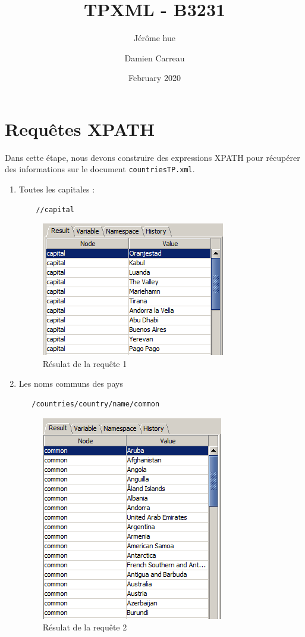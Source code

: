 \documentclass{article}
\title{TPXML - B3231}
\author{Jérôme hue \and Damien Carreau}
\date{February 2020}
\begin{document}
\maketitle

\section{Requêtes XPATH}
Dans cette étape, nous devons construire des expressions XPATH pour récupérer des informations sur le document \texttt{countriesTP.xml}.

\begin{enumerate}[1)]

\item Toutes les capitales :\\
    \begin{lstlisting}
    //capital
    \end{lstlisting}
    
    \begin{figure}[h!]
    \centering
    \includegraphics[scale=1]{query1.PNG}
    \caption{Résulat de la requête 1}
    \end{figure}

\item Les noms communs des pays \\
  \begin{lstlisting}
   /countries/country/name/common
    \end{lstlisting}
    
     
    \begin{figure}[h!]
    \centering
    \includegraphics[scale=1]{query2.PNG}
    \caption{Résulat de la requête 2}
    \end{figure}



\end{enumerate}
\end{document}
